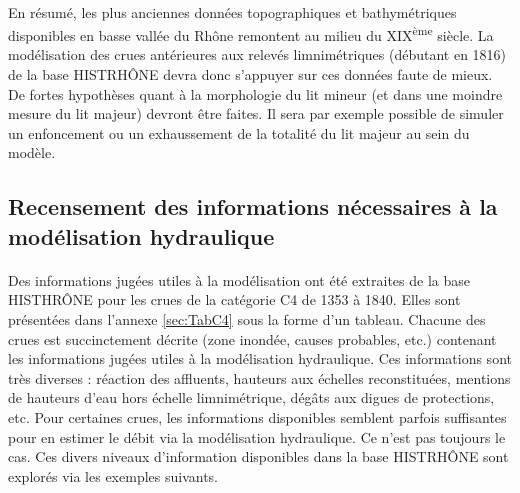 	\paragraph{} En résumé, les plus anciennes données topographiques et bathymétriques disponibles en basse vallée du Rhône remontent au milieu du XIX\textsuperscript{ème} siècle. La modélisation des crues antérieures aux relevés limnimétriques (débutant en 1816) de la base HISTRHÔNE devra donc s'appuyer sur ces données faute de mieux. De fortes hypothèses quant à la morphologie du lit mineur (et dans une moindre mesure du lit majeur) devront être faites. Il sera par exemple possible de simuler un enfoncement ou un exhaussement de la totalité du lit majeur au sein du modèle. 
	
\FloatBarrier	
	
	\subsection{Recensement des informations nécessaires à la modélisation hydraulique} 
	
	\paragraph{} Des informations jugées utiles à la modélisation ont été extraites de la base HISTHRÔNE pour les crues de la catégorie C4 de 1353 à 1840. Elles sont présentées dans l'annexe \ref{sec:TabC4} sous la forme d'un tableau. Chacune des crues est succinctement décrite (zone inondée, causes probables, etc.) contenant les informations jugées utiles à la modélisation hydraulique. Ces informations sont très diverses : réaction des affluents, hauteurs aux échelles reconstituées, mentions de hauteurs d'eau hors échelle limnimétrique, dégâts aux digues de protections, etc. Pour certaines crues, les informations disponibles semblent parfois suffisantes pour en estimer le débit via la modélisation hydraulique. Ce n'est pas toujours le cas. Ces divers niveaux d'information disponibles dans la base HISTRHÔNE sont explorés via les exemples suivants. 
	
